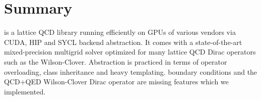 \section{Summary}
\label{sec:quda:summary}


\Quda is a lattice QCD library running efficiently on GPUs of various vendors via CUDA, HIP and SYCL backend abstraction.
It comes with a state-of-the-art mixed-precision multigrid solver optimized for many lattice QCD Dirac operators such as the Wilson-Clover.
Abstraction is practiced in terms of operator overloading, class inheritance and heavy templating.
\Cstar boundary conditions and the QCD+QED Wilson-Clover Dirac operator are missing features which we implemented.
